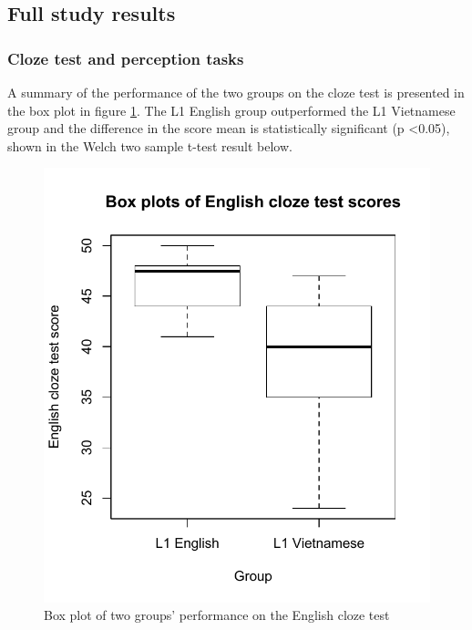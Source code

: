\documentclass[a4paper]{article}
\begin{document}
\subsection{Full study results}
\subsubsection{Cloze test and perception tasks}
A summary of the performance of the two groups on the cloze test is presented in the box plot in figure \ref{fig:clozeboxplot}. The L1 English group outperformed the L1 Vietnamese group and the difference in the score mean is statistically significant (p \textless 0.05), shown in the Welch two sample t-test result below.




\begin{figure}[!h]
\begin{center}  
\includegraphics[scale=0.7]{clozetestboxplot.pdf} 
\caption{Box plot of two groups' performance on the English cloze test}
\label{fig:clozeboxplot}
\end{center}   
\end{figure}
\end{document}
